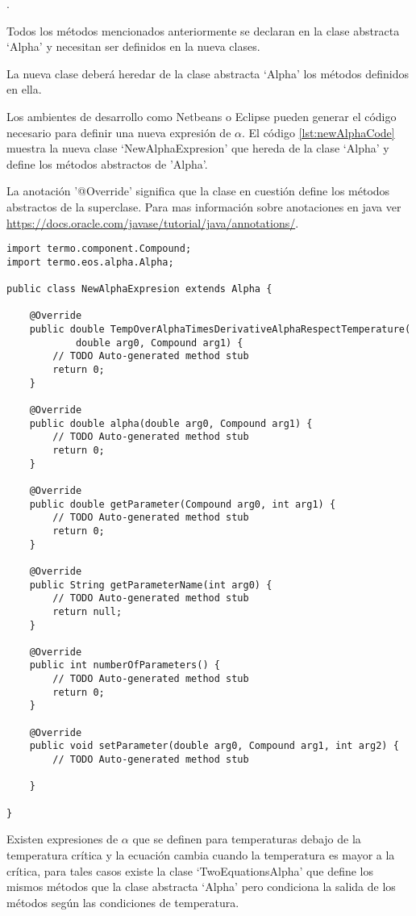 	.

	Todos los métodos mencionados anteriormente se declaran en la clase abstracta `Alpha' y necesitan ser definidos en la nueva clases. 

	La nueva clase deberá heredar de la clase abstracta `Alpha' los métodos definidos en ella.

	Los ambientes de desarrollo como Netbeans o Eclipse pueden generar el código necesario para definir una nueva expresión de $\alpha$. El código \ref{lst:newAlphaCode} muestra la nueva clase `NewAlphaExpresion' que hereda de la clase `Alpha' y define los métodos abstractos de 'Alpha'.

	La anotación '@Override' significa que la clase en cuestión define los métodos abstractos de la superclase. Para mas información sobre anotaciones en java ver \url{https://docs.oracle.com/javase/tutorial/java/annotations/}.


	\begin{lstlisting}[caption={Esqueleto para la creación de una nueva expresión de $\alpha$ para la librería materia, generado con el ambiente de desarrollo Eclipse},label={lst:newAlphaCode}]
import termo.component.Compound;
import termo.eos.alpha.Alpha;

public class NewAlphaExpresion extends Alpha {

	@Override
	public double TempOverAlphaTimesDerivativeAlphaRespectTemperature(
			double arg0, Compound arg1) {
		// TODO Auto-generated method stub
		return 0;
	}

	@Override
	public double alpha(double arg0, Compound arg1) {
		// TODO Auto-generated method stub
		return 0;
	}

	@Override
	public double getParameter(Compound arg0, int arg1) {
		// TODO Auto-generated method stub
		return 0;
	}

	@Override
	public String getParameterName(int arg0) {
		// TODO Auto-generated method stub
		return null;
	}

	@Override
	public int numberOfParameters() {
		// TODO Auto-generated method stub
		return 0;
	}

	@Override
	public void setParameter(double arg0, Compound arg1, int arg2) {
		// TODO Auto-generated method stub

	}

}

	\end{lstlisting}

	Existen expresiones de $\alpha$ que se definen para temperaturas debajo de la temperatura crítica y la ecuación cambia cuando la temperatura es mayor a la crítica, para tales casos existe la clase `TwoEquationsAlpha' que define los mismos métodos que la clase abstracta `Alpha' pero condiciona la salida de los métodos según las condiciones de temperatura. 

